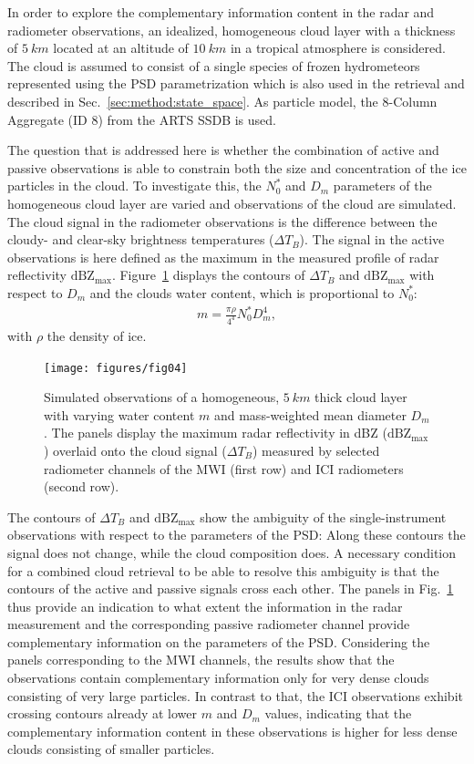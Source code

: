 \documentclass[journal abbreviation, manuscript]{copernicus}
\begin{document}
In order to explore the complementary information content in the radar and
radiometer observations, an idealized, homogeneous cloud layer with a thickness
of $5\ \unit{km}$ located at an altitude of $10\ \unit{km}$ in a tropical
atmosphere is considered. The cloud is assumed to consist of a single species of
frozen hydrometeors represented using the PSD parametrization which is also used
in the retrieval and described in Sec.~\ref{sec:method:state_space}. As particle
model, the 8-Column Aggregate (ID 8) from the ARTS SSDB is used.

The question that is addressed here is whether the combination of active and
passive observations is able to constrain both the size and concentration of the
ice particles in the cloud. To investigate this, the $N_0^*$ and $D_m$
parameters of the homogeneous cloud layer are varied and observations of the
cloud are simulated. The cloud signal in the radiometer observations is the
difference between the cloudy- and clear-sky brightness temperatures ($\Delta
T_B$). The signal in the active observations is here defined as the maximum in
the measured profile of radar reflectivity $\text{dBZ}_\text{max}$.
Figure~\ref{fig:contours} displays the contours of $\Delta T_B$ and
$\text{dBZ}_\text{max}$ with respect to $D_m$ and the clouds water content,
which is proportional to $N_0^*$:
\begin{align}
m = \frac{\pi \rho}{4 ^ 4}N_0^* D_m^4,
\end{align}
with $\rho$ the density of ice.

\begin{figure}
\centering
\texttt{[image: figures/fig04]}
\caption{Simulated observations of a homogeneous, $5\ \unit{km}$ thick cloud
  layer with varying water content $m$ and mass-weighted mean diameter $D_m$.
  The panels display the maximum radar reflectivity in dBZ
  ($\text{dBZ}_\text{max}$) overlaid onto the cloud signal ($\Delta T_B$)
  measured by selected radiometer channels of the MWI (first row) and ICI
  radiometers (second row).}
\label{fig:contours}
\end{figure}

The contours of $\Delta T_B$ and $\text{dBZ}_\text{max}$  show the ambiguity
of the single-instrument observations with respect to the parameters of the PSD:
Along these contours the signal does not change, while the cloud composition
does. A necessary condition for a combined cloud retrieval to be able to resolve
this ambiguity is that the contours of the active and passive signals cross each
other. The panels in Fig.~\ref{fig:contours} thus provide an indication to what
extent the information in the radar measurement and the corresponding passive
radiometer channel provide complementary information on the parameters of the
PSD. Considering the panels corresponding to the MWI channels, the results show
that the observations contain complementary information only for very dense
clouds consisting of very large particles. In contrast to that, the ICI
observations exhibit crossing contours already at lower $m$ and $D_m$ values,
indicating that the complementary information content in these observations is
higher for less dense clouds consisting of smaller particles.
\end{document}
